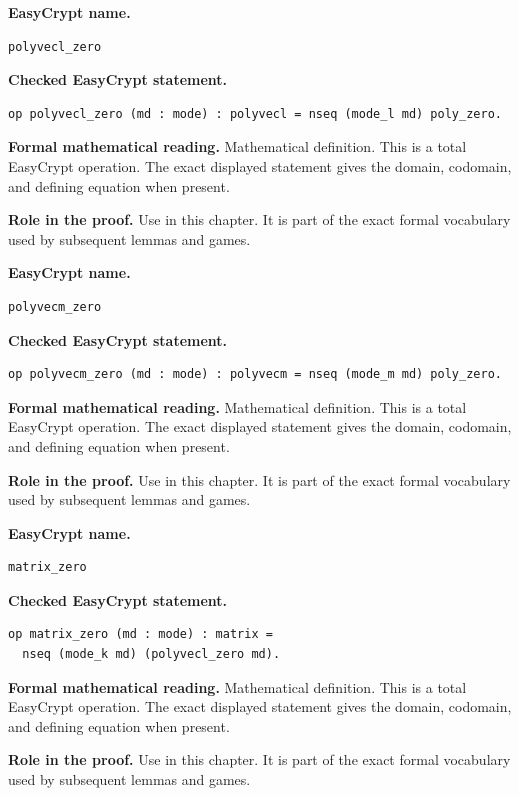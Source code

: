 \begin{formaldefinition}
\noindent\textbf{EasyCrypt name.}
\begin{lstlisting}[language=EasyCrypt,basicstyle=\ttfamily\scriptsize]
polyvecl_zero
\end{lstlisting}
\noindent\textbf{Checked EasyCrypt statement.}
\begin{lstlisting}[language=EasyCrypt,basicstyle=\ttfamily\scriptsize]
op polyvecl_zero (md : mode) : polyvecl = nseq (mode_l md) poly_zero.
\end{lstlisting}
\noindent\textbf{Formal mathematical reading.}
Mathematical definition. This is a total EasyCrypt operation.  The exact displayed statement gives the domain, codomain, and defining equation when present.

\noindent\textbf{Role in the proof.}
Use in this chapter. It is part of the exact formal vocabulary used by subsequent lemmas and games.

\end{formaldefinition}

\begin{formaldefinition}
\noindent\textbf{EasyCrypt name.}
\begin{lstlisting}[language=EasyCrypt,basicstyle=\ttfamily\scriptsize]
polyvecm_zero
\end{lstlisting}
\noindent\textbf{Checked EasyCrypt statement.}
\begin{lstlisting}[language=EasyCrypt,basicstyle=\ttfamily\scriptsize]
op polyvecm_zero (md : mode) : polyvecm = nseq (mode_m md) poly_zero.
\end{lstlisting}
\noindent\textbf{Formal mathematical reading.}
Mathematical definition. This is a total EasyCrypt operation.  The exact displayed statement gives the domain, codomain, and defining equation when present.

\noindent\textbf{Role in the proof.}
Use in this chapter. It is part of the exact formal vocabulary used by subsequent lemmas and games.

\end{formaldefinition}

\begin{formaldefinition}
\noindent\textbf{EasyCrypt name.}
\begin{lstlisting}[language=EasyCrypt,basicstyle=\ttfamily\scriptsize]
matrix_zero
\end{lstlisting}
\noindent\textbf{Checked EasyCrypt statement.}
\begin{lstlisting}[language=EasyCrypt,basicstyle=\ttfamily\scriptsize]
op matrix_zero (md : mode) : matrix =
  nseq (mode_k md) (polyvecl_zero md).
\end{lstlisting}
\noindent\textbf{Formal mathematical reading.}
Mathematical definition. This is a total EasyCrypt operation.  The exact displayed statement gives the domain, codomain, and defining equation when present.

\noindent\textbf{Role in the proof.}
Use in this chapter. It is part of the exact formal vocabulary used by subsequent lemmas and games.

\end{formaldefinition}

